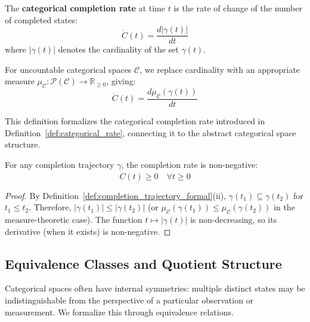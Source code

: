 \begin{definition}
\label{def:completion_rate_formal}
The \textbf{categorical completion rate} at time $t$ is the rate of change of the number of completed states:
\begin{equation}
\dot{C}(t) = \frac{d|\gamma(t)|}{dt}
\label{eq:completion_rate_formal}
\end{equation}
where $|\gamma(t)|$ denotes the cardinality of the set $\gamma(t)$.

For uncountable categorical spaces $\mathcal{C}$, we replace cardinality with an appropriate measure $\mu_{\mathcal{C}}: \mathcal{P}(\mathcal{C}) \to \mathbb{R}_{\geq 0}$, giving:
\begin{equation}
\dot{C}(t) = \frac{d\mu_{\mathcal{C}}(\gamma(t))}{dt}
\end{equation}
\end{definition}

This definition formalizes the categorical completion rate introduced in Definition~\ref{def:categorical_rate}, connecting it to the abstract categorical space structure.

\begin{proposition}
\label{prop:nonnegative_rate_formal}
For any completion trajectory $\gamma$, the completion rate is non-negative:
\begin{equation}
\dot{C}(t) \geq 0 \quad \forall t \geq 0
\label{eq:nonnegative_rate}
\end{equation}
\end{proposition}

\begin{proof}
By Definition~\ref{def:completion_trajectory_formal}(ii), $\gamma(t_1) \subseteq \gamma(t_2)$ for $t_1 \leq t_2$. Therefore, $|\gamma(t_1)| \leq |\gamma(t_2)|$ (or $\mu_{\mathcal{C}}(\gamma(t_1)) \leq \mu_{\mathcal{C}}(\gamma(t_2))$ in the measure-theoretic case). The function $t \mapsto |\gamma(t)|$ is non-decreasing, so its derivative (when it exists) is non-negative.
\end{proof}

\subsection{Equivalence Classes and Quotient Structure}

Categorical spaces often have internal symmetries: multiple distinct states may be indistinguishable from the perspective of a particular observation or measurement. We formalize this through equivalence relations.

